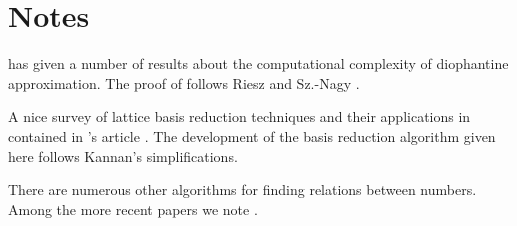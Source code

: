 \section*{Notes}

\small

{\Lagarias} \cite{Lagarias1985-uo} has given a number of results
about the computational complexity of diophantine approximation.
The proof of  follows Riesz and Sz.-Nagy
\cite{Riesz1990-aj}. 

 A nice survey of lattice basis
reduction techniques and their applications in contained in \Kannan's
article \cite{Kannan1987-cd}.  The development of the basis reduction
algorithm given here follows Kannan's simplifications.

  There are numerous other algorithms
for finding relations between numbers.  Among the more recent papers
we note \cite{Bailey1989-lg,Kannan1986-ax,Hastad1989-ce}.

\normalsize
